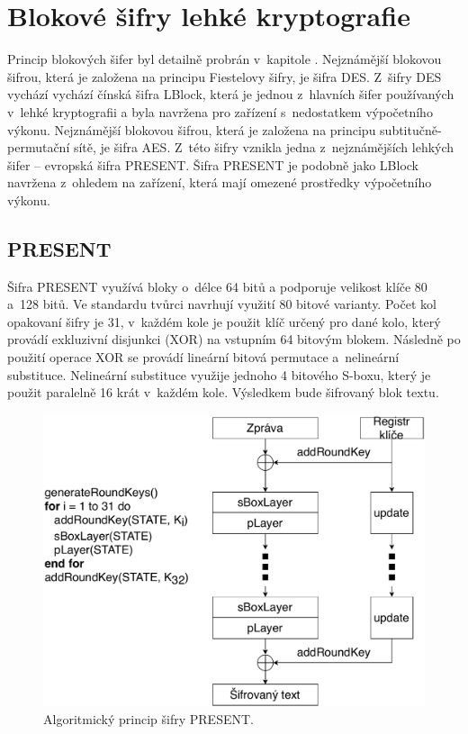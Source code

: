 \section{Blokové šifry lehké kryptografie}
Princip blokových šifer byl detailně probrán v~kapitole . Nejznámější blokovou šifrou, která je založena na principu Fiestelovy šifry, je šifra DES. Z~šifry DES vychází vychází čínská šifra LBlock, která je jednou z~hlavních šifer používaných v~lehké kryptografii a byla navržena pro zařízení s~nedostatkem výpočetního výkonu. Nejznámější blokovou šifrou, která je založena na principu subtitučně-permutační sítě, je šifra AES. Z~této šifry vznikla jedna z~nejznámějších lehkých šifer -- evropská šifra PRESENT. Šifra PRESENT je podobně jako LBlock navržena z~ohledem na zařízení, která mají omezené prostředky výpočetního výkonu.\cite{NekuzaBP}

\subsection{PRESENT}
Šifra PRESENT využívá bloky o~délce 64 bitů a podporuje velikost klíče 80 a~128 bitů. Ve standardu tvůrci navrhují využití 80 bitové varianty. Počet kol opakovaní šifry je 31, v~každém kole je použit klíč určený pro dané kolo, který provádí exkluzivní disjunkci (XOR) na vstupním 64 bitovým blokem. Následně po použití operace XOR se provádí lineární bitová permutace a~nelineární substituce. Nelineární substituce využije jednoho 4 bitového S-boxu, který je použit paralelně 16 krát v~každém kole. Výsledkem bude šifrovaný blok textu.\cite{PRESENT}
\begin{figure}[!h]
  \begin{center}
    \includegraphics[scale=0.5]{obrazky/present.pdf}
  \end{center}
  \caption[Algoritmcký princip šifry PRESENT]{Algoritmický princip šifry PRESENT.\cite{PRESENT}}
  \label{img:present}
\end{figure}

